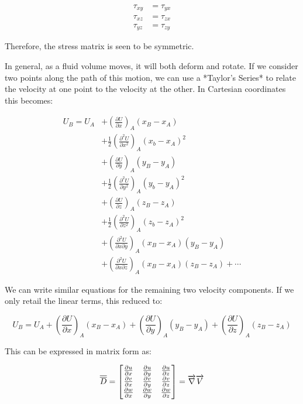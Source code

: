 \begin{align*}
\tau_{xy} &= \tau_{yx} \\
\tau_{xz} &= \tau_{zx} \\
\tau_{yz} &= \tau_{zy}
\end{align*}

Therefore, the stress matrix is seen to be symmetric.

In general, as a fluid volume moves, it will both deform and rotate. If we
consider two points along the path of this motion, we can use a *Taylor's
Series* to relate the velocity at one point to the velocity at the other. In
Cartesian coordinates this becomes:

\begin{equation}
\begin{aligned}
U_B = U_A & + \left(\frac{\partial U}{\partial x}\right)_A (x_B - x_A) \\
    & + \frac{1}{2}\left(\frac{\partial^2 U}{\partial x^2}\right)_A (x_b - x_A)^2 \\
    & + \left(\frac{\partial U}{\partial y}\right)_A (y_B - y_A) \\
    & + \frac{1}{2}\left(\frac{\partial^2 U}{\partial y^2}\right)_A (y_b - y_A)^2 \\
    & + \left(\frac{\partial U}{\partial z}\right)_A (z_B - z_A) \\
    & + \frac{1}{2}\left(\frac{\partial^2 U}{\partial z^2}\right)_A (z_b - z_A)^2 \\
    & + \left(\frac{\partial^2 U}{\partial x \partial y}\right)_A (x_B - x_A)(y_B - y_A) \\
    & + \left(\frac{\partial^2 U}{\partial x \partial z}\right)_A (x_B - x_A)(z_B - z_A) + \cdots
\end{aligned}
\end{equation}

We can write similar equations for the remaining two velocity components. If we only retail the linear terms, this reduced to:

\begin{equation}
U_B = U_A + \left(\frac{\partial U}{\partial x}\right)_A (x_B - x_A)  + \left(\frac{\partial U}{\partial y}\right)_A (y_B - y_A)  + \left(\frac{\partial U}{\partial z}\right)_A (z_B - z_A)
\end{equation}

This can be expressed in matrix form as:

\begin{equation}
  \overline{\overline{D}} = \begin{bmatrix}
  \frac{\partial{u}}{\partial{x}} & 
  \frac{\partial{u}}{\partial{y}} & 
  \frac{\partial{u}}{\partial{z}} \\

  \frac{\partial{v}}{\partial{x}} & 
  \frac{\partial{v}}{\partial{y}} & 
  \frac{\partial{v}}{\partial{z}} \\

  \frac{\partial{w}}{\partial{x}} & 
  \frac{\partial{w}}{\partial{y}} & 
  \frac{\partial{w}}{\partial{z}}
  \end{bmatrix} = \overrightarrow{\nabla}\overrightarrow{V}
\end{equation}

